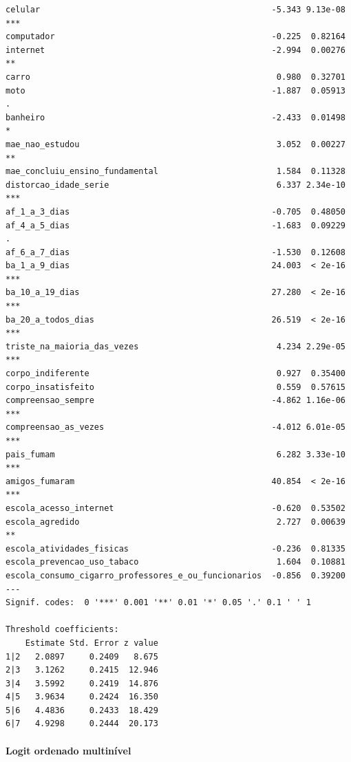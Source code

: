 \documentclass[
]{article}
\let\oldparagraph\paragraph
\renewcommand{\paragraph}[1]{\oldparagraph{#1}\mbox{}}
\begin{document}
\begin{verbatim}
celular                                               -5.343 9.13e-08 ***
computador                                            -0.225  0.82164    
internet                                              -2.994  0.00276 ** 
carro                                                  0.980  0.32701    
moto                                                  -1.887  0.05913 .  
banheiro                                              -2.433  0.01498 *  
mae_nao_estudou                                        3.052  0.00227 ** 
mae_concluiu_ensino_fundamental                        1.584  0.11328    
distorcao_idade_serie                                  6.337 2.34e-10 ***
af_1_a_3_dias                                         -0.705  0.48050    
af_4_a_5_dias                                         -1.683  0.09229 .  
af_6_a_7_dias                                         -1.530  0.12608    
ba_1_a_9_dias                                         24.003  < 2e-16 ***
ba_10_a_19_dias                                       27.280  < 2e-16 ***
ba_20_a_todos_dias                                    26.519  < 2e-16 ***
triste_na_maioria_das_vezes                            4.234 2.29e-05 ***
corpo_indiferente                                      0.927  0.35400    
corpo_insatisfeito                                     0.559  0.57615    
compreensao_sempre                                    -4.862 1.16e-06 ***
compreensao_as_vezes                                  -4.012 6.01e-05 ***
pais_fumam                                             6.282 3.33e-10 ***
amigos_fumaram                                        40.854  < 2e-16 ***
escola_acesso_internet                                -0.620  0.53502    
escola_agredido                                        2.727  0.00639 ** 
escola_atividades_fisicas                             -0.236  0.81335    
escola_prevencao_uso_tabaco                            1.604  0.10881    
escola_consumo_cigarro_professores_e_ou_funcionarios  -0.856  0.39200    
---
Signif. codes:  0 '***' 0.001 '**' 0.01 '*' 0.05 '.' 0.1 ' ' 1

Threshold coefficients:
    Estimate Std. Error z value
1|2   2.0897     0.2409   8.675
2|3   3.1262     0.2415  12.946
3|4   3.5992     0.2419  14.876
4|5   3.9634     0.2424  16.350
5|6   4.4836     0.2433  18.429
6|7   4.9298     0.2444  20.173
\end{verbatim}

\hypertarget{logit-ordenado-multinuxedvel}{%
\paragraph{Logit ordenado
multinível}\label{logit-ordenado-multinuxedvel}}
\end{document}
